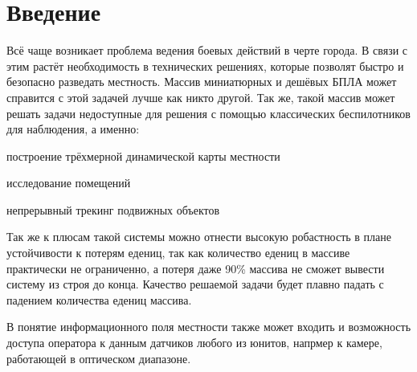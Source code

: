 \newpage
\section{Введение}

Всё чаще возникает проблема ведения боевых действий
в черте города. В связи с этим растёт необходимость в технических
решениях, которые позволят быстро и безопасно разведать местность.
Массив миниатюрных и дешёвых БПЛА может справится с этой задачей 
лучше как никто другой. Так же, такой массив может решать задачи недоступные
для решения с помощью классических беспилотников для наблюдения, а именно: 
\begin{mintemize}
    \item построение трёхмерной динамической карты местности
    \item исследование помещений
    \item непрерывный трекинг подвижных объектов
\end{mintemize}

Так же к плюсам такой системы можно отнести высокую робастность в плане
устойчивости к потерям едениц, так как количество едениц в массиве
практически не ограниченно, а потеря даже 90\% массива не сможет
вывести систему из строя до конца.  Качество решаемой задачи
будет плавно падать с падением количества едениц массива.

В понятие информационного поля местности также может входить
и возможность доступа оператора к данным датчиков любого из юнитов, напрмер
к камере, работающей в оптическом диапазоне.
